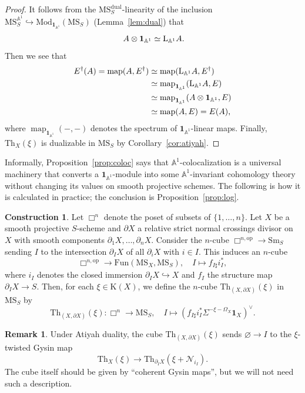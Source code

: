 \documentclass{amsart}
\numberwithin{equation}{section}
\theoremstyle{plain}
\theoremstyle{definition}
\newtheorem{construction}[equation]{Construction}
\newtheorem{remark}[equation]{Remark}
\let\bb=\mathbb
\def\A{\bb A}
\def\1{\mathbf 1}
\def\ph{\mathord-}
\def\L{\mathrm{L}{}}
\let\into=\hookrightarrow
\let\emptyset=\varnothing
\def\Th{\mathrm{Th}}
\let\cat=\mathrm
\def\K{\mathrm{K}{}}
\def\Mod{\cat{M}\mathrm{od}{}}
\def\Sm{{\cat{S}\mathrm{m}}}
\def\op{\mathrm{op}}
\def\MS{\mathrm{MS}}
\def\Fun{\mathrm{Fun}}
\newcommand{\map}{\operatorname{map}}
\def\dual{\mathrm{dual}}
\begin{document}
\begin{proof}
It follows from the $\MS_S^\dual$-linearity of the inclusion $\MS_S^{\A^1}\into \Mod_{\1_{\A^1}}(\MS_S)$ (Lemma~\ref{lem:dual}) that
\[
	A\otimes\1_{\A^1} \simeq \L_{\A^1}A \rlap.
\]
Then we see that
\[
\begin{split}
	E^\dagger(A)  = \map(A,E^\dagger)
	&\simeq \map(\L_{\A^1}A,E^\dagger) \\
	&\simeq \map_{\1_{\A^1}}(\L_{\A^1}A,E) \\
	&\simeq \map_{\1_{\A^1}}(A\otimes\1_{\A^1},E) \\
	&\simeq \map(A,E) = E(A) \rlap,
\end{split}
\]
where $\map_{\1_{\A^1}}(\ph,\ph)$ denotes the spectrum of $\1_{\A^1}$-linear maps.
Finally, $\Th_X(\xi)$ is dualizable in $\MS_S$ by Corollary~\ref{cor:atiyah}.
\end{proof}

Informally, Proposition~\ref{prop:coloc} says that $\A^1$-colocalization is a universal machinery that converts a $\1_{\A^1}$-module into some $\A^1$-invariant cohomology theory without changing its values on smooth projective schemes.
The following is how it is calculated in practice; the conclusion is Proposition~\ref{prop:log}.

\begin{construction}\label{cst:sncd}
Let $\Box^n$ denote the poset of subsets of $\{1,\dotsc,n\}$.
Let $X$ be a smooth projective $S$-scheme and $\partial X$ a relative strict normal crossings divisor on $X$ with smooth components $\partial_1X,\dotsc,\partial_nX$. Consider the $n$-cube $\Box^{n,\op}\to\Sm_S$ sending $I$ to the intersection $\partial_IX$ of all $\partial_iX$ with $i\in I$.
This induces an $n$-cube
\[
	\Box^{n,\op}\to \Fun(\MS_X,\MS_S),\quad I \mapsto f_{I\sharp}i_I^*,
\]
where $i_I$ denotes the closed immersion $\partial_IX\into X$ and $f_I$ the structure map $\partial_IX\to S$.
Then, for each $\xi\in\K(X)$, we define the $n$-cube $\Th_{(X,\partial X)}(\xi)$ in $\MS_S$ by
\[
	\Th_{(X,\partial X)}(\xi)\colon \Box^{n}\to\MS_S,\quad I\mapsto (f_{I\sharp}i_I^*\Sigma^{-\xi-\Omega_X}\1_X)^\vee.
\]
\end{construction}

\begin{remark}
Under Atiyah duality, the cube $\Th_{(X,\partial X)}(\xi)$ sends $\emptyset\to I$ to the $\xi$-twisted Gysin map
\[
	\Th_X(\xi) \to \Th_{\partial_IX}(\xi+\mathcal{N}_{i_I}).
\]
The cube itself should be given by ``coherent Gysin maps'', but we will not need such a description.
\end{remark}
\end{document}
